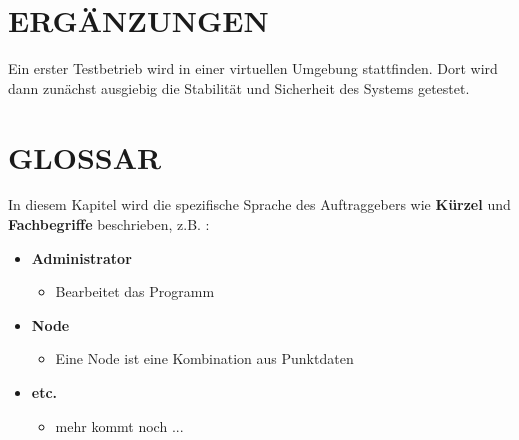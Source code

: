 	
	
	
	
	
	\section{\Large ERGÄNZUNGEN}
	Ein erster Testbetrieb wird in einer virtuellen Umgebung stattfinden. Dort wird dann zunächst ausgiebig die Stabilität und Sicherheit des Systems getestet.
	
	
	\section{\Large GLOSSAR}
	In diesem Kapitel wird die spezifische Sprache des Auftraggebers wie \textbf{ Kürzel } und \textbf{ Fachbegriffe } beschrieben, z.B. :
	\begin{itemize}
		\item \textbf{ Administrator }
		\begin{itemize}
			\item Bearbeitet das Programm
		\end{itemize}
	\end{itemize}
	\begin{itemize}
		\item \textbf{ Node }
		\begin{itemize}
			\item Eine Node ist eine Kombination aus Punktdaten
		\end{itemize}
	\end{itemize}
	\begin{itemize}
		\item \textbf{ etc. }
		\begin{itemize}
			\item mehr kommt noch ...
		\end{itemize}
	\end{itemize}

		